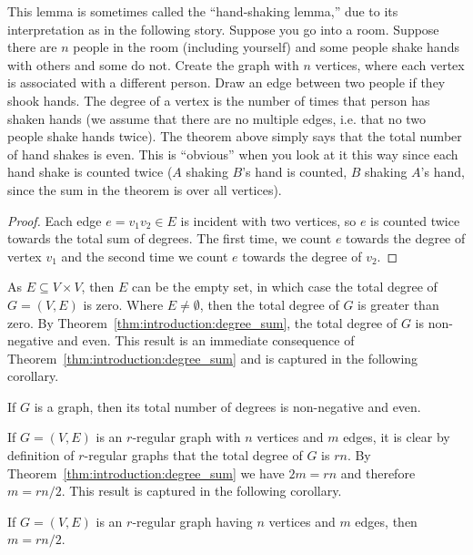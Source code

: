 This lemma is sometimes called the ``hand-shaking lemma,'' due to its
interpretation as in the following story. Suppose you go into a
room. Suppose there are $n$ people in the room (including yourself)
and some people shake hands with others and some do not. Create the
graph with $n$ vertices, where each vertex is associated with a
different person. Draw an edge between two people if they shook
hands. The degree of a vertex is the number of times that person has
shaken hands (we assume that there are no multiple edges, i.e. that no
two people shake hands twice). The theorem above simply says that the
total number of hand shakes is even. This is ``obvious'' when you look
at it this way since each hand shake is counted twice ($A$ shaking
$B$'s hand is counted, $B$ shaking $A$'s hand, since the sum in the
theorem is over all vertices).

\begin{proof}
Each edge $e = v_1 v_2 \in E$ is incident with two vertices, so $e$ is
counted twice towards the total sum of degrees. The first time, we
count $e$ towards the degree of vertex $v_1$ and the second time we
count $e$ towards the degree of $v_2$.
\end{proof}

As $E \subseteq V \times V$, then $E$ can be the empty set, in which
case the total degree of $G = (V, E)$ is zero. Where $E \neq
\emptyset$, then the total degree of $G$ is greater than zero. By
Theorem~\ref{thm:introduction:degree_sum}, the total degree of $G$ is
non-negative and even. This result is an immediate consequence of
Theorem~\ref{thm:introduction:degree_sum} and is captured in the
following corollary.

\begin{corollary}
\label{cor:introduction:degree_sum_even}
If $G$ is a graph, then its total number of degrees is non-negative
and even.
\end{corollary}

If $G = (V, E)$ is an $r$-regular graph with $n$ vertices and $m$
edges, it is clear by definition of $r$-regular graphs that the total
degree of $G$ is $rn$. By Theorem~\ref{thm:introduction:degree_sum} we
have $2m = rn$ and therefore $m = rn / 2$. This result is captured in
the following corollary.

\begin{corollary}
If $G = (V, E)$ is an $r$-regular graph having $n$ vertices and $m$
edges, then $m = rn / 2$.
\end{corollary}


